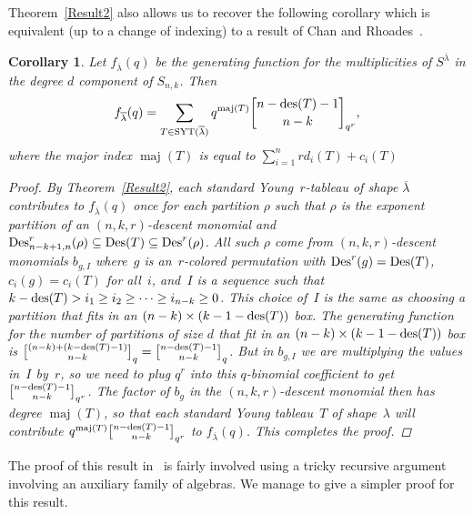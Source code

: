 \documentclass[10pt]{article}
\newcommand{\maj}{\operatorname{maj}}\newcommand{\shape}{\operatorname{shape}}\newcommand{\sh}{\operatorname{sh}}
\newtheorem{coro}[thm]{Corollary}
\begin{document}

Theorem~\ref{Result2} also allows us to recover the following corollary which is equivalent (up to a change of indexing) to a 
result of Chan and Rhoades~\cite{CR}.

\begin{coro}
	Let $f_{\overline{\lambda}}(q)$ be the generating function for the multiplicities of $S^{\overline{\lambda}}$ in the degree 
$d$ component of $S_{n,k}$. Then
\begin{equation}
f_{\overline{\lambda}}(q)=\sum_{T\in \SYT (\overline{\lambda})} 
q^{\maj(T)}\genfrac{[}{]}{0pt}{}{n-\des (T)-1}{n-k}_{q^r},
\end{equation}
	where the major index $\maj(T)$ is equal to $\sum_{i=1}^n rd_i(T)+c_i(T)$
	\begin{proof}

		By Theorem~\ref{Result2}, each standard Young~$r$-tableau of shape $\overline{\lambda}$ contributes to 
$f_{\overline{\lambda}}(q)$ once for each partition $\rho$ such that $\rho$ is the exponent partition of an 
$(n,k,r)$-descent monomial and $\operatorname{Des} ^r_{n-k+1,n}(\rho)\subseteq \operatorname{Des} (T)\subseteq \operatorname{Des} ^r(\rho)$. All such $\rho$ come from 
$(n,k,r)$-descent monomials $b_{g,I}$ where~$g$ is an~$r$-colored permutation with $\operatorname{Des} ^r(g)=\operatorname{Des} (T)$, $c_i(g)=c_i(T)$ 
for all~$i$, and~$I$ is a sequence such that $k-\operatorname{des} (T)>i_1\geq i_2\geq\cdots\geq i_{n-k}\geq 0$. This choice of~$I$ 
is the same as choosing a partition that fits in an $(n-k)\times (k-1-\operatorname{des} (T))$ box. The generating function for the 
number of partitions of size $d$ that fit in an $(n-k)\times (k-1-\operatorname{des} (T))$ box is 
$\genfrac{[}{]}{0pt}{}{(n-k)+(k-\des (T)-1)}{n-k}_q=\genfrac{[}{]}{0pt}{}{n-\des (T)-1}{n-k}_q$. But in $b_{g,I}$ we are 
multiplying the values in~$I$ by~$r$, so we need to plug $q^r$ into this $q$-binomial coefficient to get 
$\genfrac{[}{]}{0pt}{}{n-\des (T)-1}{n-k}_{q^r}$. The factor of $b_g$ in the $(n,k,r)$-descent monomial then has degree 
$\maj(T)$, so that each standard Young tableau~$T$ of shape~$\lambda$ will contribute 
$q^{\maj(T)}\genfrac{[}{]}{0pt}{}{n-\des (T)-1}{n-k}_{q^r}$ to $f_{\overline{\lambda}}(q)$. This completes the proof.
	\end{proof}
\end{coro}

The proof of this result in~\cite{CR} is fairly involved using a tricky recursive argument involving an auxiliary family of 
algebras. We manage to give a simpler proof for this result.
\end{document}
